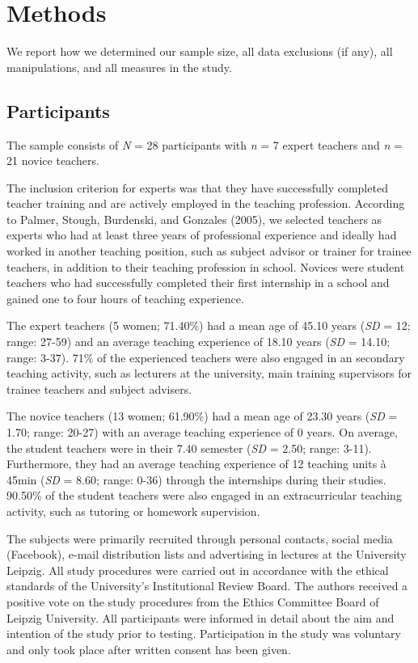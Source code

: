 \documentclass[
  man,floatsintext]{apa6}
\begin{document}
\hypertarget{methods}{%
\section{Methods}\label{methods}}

We report how we determined our sample size, all data exclusions (if any), all manipulations, and all measures in the study.

\hypertarget{participants}{%
\subsection{Participants}\label{participants}}

The sample consists of \emph{N} = 28 participants with \emph{n} = 7 expert teachers and \emph{n} = 21 novice teachers.

The inclusion criterion for experts was that they have successfully completed teacher training and are actively employed in the teaching profession. According to Palmer, Stough, Burdenski, and Gonzales (2005), we selected teachers as experts who had at least three years of professional experience and ideally had worked in another teaching position, such as subject advisor or trainer for trainee teachers, in addition to their teaching profession in school. Novices were student teachers who had successfully completed their first internship in a school and gained one to four hours of teaching experience.

The expert teachers (5 women; 71.40\%) had a mean age of 45.10 years (\emph{SD} = 12; range: 27-59) and an average teaching experience of 18.10 years (\emph{SD} = 14.10; range: 3-37). 71\% of the experienced teachers were also engaged in an secondary teaching activity, such as lecturers at the university, main training supervisors for trainee teachers and subject advisers.

The novice teachers (13 women; 61.90\%) had a mean age of 23.30 years (\emph{SD} = 1.70; range: 20-27) with an average teaching experience of 0 years. On average, the student teachers were in their 7.40 semester (\emph{SD} = 2.50; range: 3-11). Furthermore, they had an average teaching experience of 12 teaching units à 45min (\emph{SD} = 8.60; range: 0-36) through the internships during their studies. 90.50\% of the student teachers were also engaged in an extracurricular teaching activity, such as tutoring or homework supervision.

The subjects were primarily recruited through personal contacts, social media (Facebook), e-mail distribution lists and advertising in lectures at the University Leipzig. All study procedures were carried out in accordance with the ethical standards of the University's Institutional Review Board. The authors received a positive vote on the study procedures from the Ethics Committee Board of Leipzig University. All participants were informed in detail about the aim and intention of the study prior to testing. Participation in the study was voluntary and only took place after written consent has been given.
\end{document}

